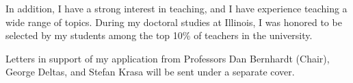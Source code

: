 \documentclass[12pt]{letter}
\begin{document}
\begin{letter}{}





In addition, I have a strong interest in teaching, and I have experience teaching a wide range of topics.
During my doctoral studies at Illinois, I was honored to be selected by my students among the top 10\% of teachers in the university.


Letters in support of my application from Professors Dan Bernhardt (Chair), George Deltas, and Stefan Krasa will be sent under a separate cover. 


\end{letter}
\end{document}
